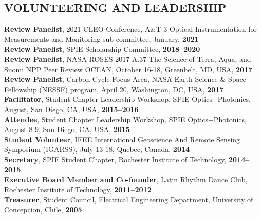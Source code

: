 \documentclass[11pt]{res}
\begin{document}
\begin{resume}
\vspace{-0.1in}
\section{VOLUNTEERING AND LEADERSHIP}
\vspace{0.1in}
{\bf Review Panelist}, 2021 CLEO Conference, A\&T 3 Optical Instrumentation for Measurements and Monitoring sub-committee, January, {\bf 2021}
\vspace{0.1in}\\
{\bf Review Panelist}, SPIE Scholarship Committee, {\bf 2018--2020}
\vspace{0.1in}\\
{\bf Review Panelist}, NASA ROSES-2017 A.37 The Science of Terra, Aqua, and Suomi NPP Peer Review OCEAN, October 16-18, Greenbelt, MD, USA, {\bf 2017}
\vspace{0.1in}\\
{\bf Review Panelist}, Carbon Cycle Focus Area, NASA Earth Science \& Space Fellowship (NESSF) program, April 20, Washington, DC, USA, {\bf 2017}
\vspace{0.1in}\\
{\bf Facilitator}, Student Chapter Leadership Workshop, SPIE Optics+Photonics, August, San Diego, CA, USA, {\bf 2015--2016}
\vspace{0.1in}\\
{\bf Attendee}, Student Chapter Leadership Workshop, SPIE Optics+Photonics, August 8-9, San Diego, CA, USA, {\bf 2015}
\vspace{0.1in}\\
{\bf Student Volunteer}, IEEE International Geoscience And Remote Sensing Symposium (IGARSS), July 13-18, Quebec, Canada, {\bf 2014}
\vspace{0.1in}\\
{\bf Secretary}, SPIE Student Chapter, Rochester Institute of Technology, {\bf 2014--2015}
\vspace{0.1in}\\
{\bf Executive Board Member and Co-founder}, Latin Rhythm Dance Club, Rochester Institute of Technology, {\bf 2011--2012}
\vspace{0.1in}\\
{\bf Treasurer}, Student Council, Electrical Engineering Department, University of Concepcion, Chile, {\bf 2005}\\
\vspace{-0.1in}

\end{resume}
\end{document}
